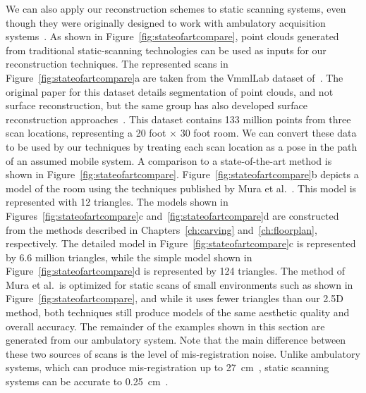 \documentclass[12pt,onecolumn,oneside]{book}
\begin{document}
We can also apply our reconstruction schemes to static scanning systems, even though they were originally designed to work with ambulatory acquisition systems~\cite{Backpack}.  As shown in Figure~\ref{fig:stateofartcompare}, point clouds generated from traditional static-scanning technologies can be used as inputs for our reconstruction techniques. The represented scans in Figure~\ref{fig:stateofartcompare}a are taken from the VmmlLab dataset of~\cite{Mattausch14}.  The original paper for this dataset details segmentation of point clouds, and not surface reconstruction, but the same group has also developed surface reconstruction approaches~\cite{Mura13,Mura14}. This dataset contains 133 million points from three scan locations, representing a 20 foot $\times$ 30 foot room.  We can convert these data to be used by our techniques by treating each scan location as a pose in the path of an assumed mobile system.  A comparison to a state-of-the-art method is shown in Figure~\ref{fig:stateofartcompare}.  Figure~\ref{fig:stateofartcompare}b depicts a model of the room using the techniques published by Mura et al.~\cite{Mura13}.  This model is represented with 12 triangles.  The models shown in Figures~\ref{fig:stateofartcompare}c and~\ref{fig:stateofartcompare}d are constructed from the methods described in Chapters~\ref{ch:carving} and~\ref{ch:floorplan}, respectively.  The detailed model in Figure~\ref{fig:stateofartcompare}c is represented by 6.6 million triangles, while the simple model shown in Figure~\ref{fig:stateofartcompare}d is represented by 124 triangles.  The method of Mura et al.\ is optimized for static scans of small environments such as shown in Figure~\ref{fig:stateofartcompare}, and while it uses fewer triangles than our 2.5D method, both techniques still produce models of the same aesthetic quality and overall accuracy.  The remainder of the examples shown in this section are generated from our ambulatory system.  Note that the main difference between these two sources of scans is the level of mis-registration noise. Unlike ambulatory systems, which can produce mis-registration up to 27~cm~\cite{NickJournal}, static scanning systems can be accurate to 0.25~cm~\cite{Mura13}.
\end{document}
